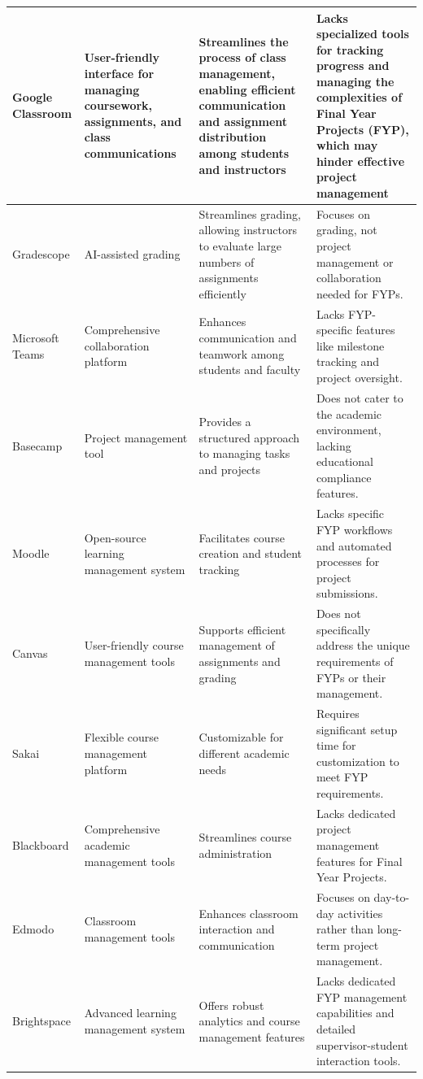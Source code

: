 \documentclass{FastFyp}
\begin{document}
\begin{longtable}{|p{2.5cm}|p{2.5cm}|p{4cm}|p{5cm}|}
Google Classroom \cite{ref:classroom} & User-friendly interface for managing coursework, assignments, and class communications & Streamlines the process of class management, enabling efficient communication and assignment distribution among students and instructors & Lacks specialized tools for tracking progress and managing the complexities of Final Year Projects (FYP), which may hinder effective project management \\
\hline
Gradescope \cite{ref:gradescope} & AI-assisted grading & Streamlines grading, allowing instructors to evaluate large numbers of assignments efficiently & Focuses on grading, not project management or collaboration needed for FYPs. \\
\hline
Microsoft Teams \cite{ref:teams} & Comprehensive collaboration platform & Enhances communication and teamwork among students and faculty & Lacks FYP-specific features like milestone tracking and project oversight. \\
\hline
Basecamp \cite{ref:basecamp} & Project management tool & Provides a structured approach to managing tasks and projects & Does not cater to the academic environment, lacking educational compliance features. \\
\hline
Moodle \cite{ref:moodle} & Open-source learning management system & Facilitates course creation and student tracking & Lacks specific FYP workflows and automated processes for project submissions. \\
\hline
Canvas \cite{ref:canvas} & User-friendly course management tools & Supports efficient management of assignments and grading & Does not specifically address the unique requirements of FYPs or their management. \\
\hline
Sakai \cite{ref:sakai} & Flexible course management platform & Customizable for different academic needs & Requires significant setup time for customization to meet FYP requirements. \\
\hline
Blackboard \cite{ref:blackboard} & Comprehensive academic management tools & Streamlines course administration & Lacks dedicated project management features for Final Year Projects. \\
\hline
Edmodo \cite{ref:edmodo} & Classroom management tools & Enhances classroom interaction and communication & Focuses on day-to-day activities rather than long-term project management. \\
\hline
Brightspace \cite{ref:brightspace} & Advanced learning management system & Offers robust analytics and course management features & Lacks dedicated FYP management capabilities and detailed supervisor-student interaction tools. \\
\hline

\end{longtable}
\end{document}

